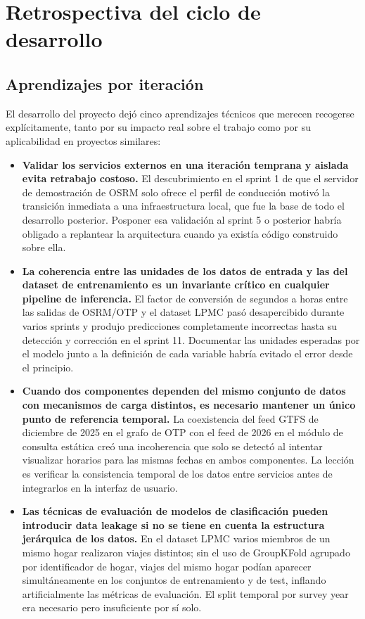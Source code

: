 \section{Retrospectiva del ciclo de desarrollo}

\subsection{Aprendizajes por iteración}

El desarrollo del proyecto dejó cinco aprendizajes técnicos que merecen recogerse explícitamente, tanto por su impacto real sobre el trabajo como por su aplicabilidad en proyectos similares:

\begin{itemize}
  \item \textbf{Validar los servicios externos en una iteración temprana y aislada evita retrabajo costoso.} El descubrimiento en el sprint 1 de que el servidor de demostración de OSRM solo ofrece el perfil de conducción motivó la transición inmediata a una infraestructura local, que fue la base de todo el desarrollo posterior. Posponer esa validación al sprint 5 o posterior habría obligado a replantear la arquitectura cuando ya existía código construido sobre ella.

  \item \textbf{La coherencia entre las unidades de los datos de entrada y las del dataset de entrenamiento es un invariante crítico en cualquier pipeline de inferencia.} El factor de conversión de segundos a horas entre las salidas de OSRM/OTP y el dataset LPMC pasó desapercibido durante varios sprints y produjo predicciones completamente incorrectas hasta su detección y corrección en el sprint 11. Documentar las unidades esperadas por el modelo junto a la definición de cada variable habría evitado el error desde el principio.

  \item \textbf{Cuando dos componentes dependen del mismo conjunto de datos con mecanismos de carga distintos, es necesario mantener un único punto de referencia temporal.} La coexistencia del feed GTFS de diciembre de 2025 en el grafo de OTP con el feed de 2026 en el módulo de consulta estática creó una incoherencia que solo se detectó al intentar visualizar horarios para las mismas fechas en ambos componentes. La lección es verificar la consistencia temporal de los datos entre servicios antes de integrarlos en la interfaz de usuario.

  \item \textbf{Las técnicas de evaluación de modelos de clasificación pueden introducir data leakage si no se tiene en cuenta la estructura jerárquica de los datos.} En el dataset LPMC varios miembros de un mismo hogar realizaron viajes distintos; sin el uso de GroupKFold agrupado por identificador de hogar, viajes del mismo hogar podían aparecer simultáneamente en los conjuntos de entrenamiento y de test, inflando artificialmente las métricas de evaluación. El split temporal por survey year era necesario pero insuficiente por sí solo.


\end{itemize}
